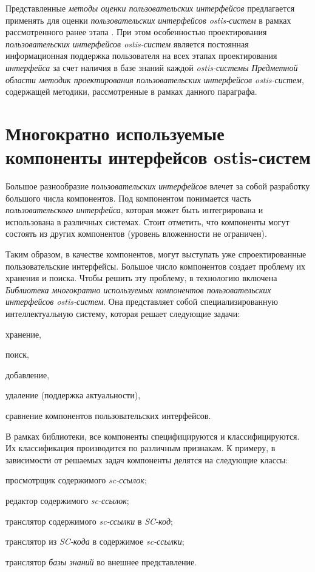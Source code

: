 Представленные \textit{методы оценки пользовательских интерфейсов} предлагается применять для оценки \textit{пользовательских интерфейсов ostis-систем} в рамках рассмотренного ранее этапа . При этом особенностью проектирования \textit{пользовательских интерфейсов ostis-систем} является постоянная информационная поддержка пользователя на всех этапах проектирования \textit{интерфейса} за счет наличия в базе знаний каждой \textit{ostis-системы} \textit{Предметной области методик проектирования пользовательских интерфейсов ostis-систем}, содержащей методики, рассмотренные в рамках данного параграфа.


\section{Многократно используемые компоненты интерфейсов ostis-систем}
\label{sec_reusable_UI_components}

Большое разнообразие \textit{пользовательских интерфейсов} влечет за собой разработку большого числа компонентов. Под компонентом понимается часть \textit{пользовательского интерфейса}, которая может быть интегрирована и использована в различных системах.
Стоит отметить, что компоненты могут состоять из других компонентов (уровень вложенности не ограничен). 

Таким образом, в качестве компонентов, могут выступать уже спроектированные
пользовательские интерфейсы. Большое число компонентов создает проблему их хранения и поиска. Чтобы решить эту проблему, в технологию включена \textit{Библиотека многократно используемых компонентов пользовательских интерфейсов ostis-систем}. Она представляет собой специализированную интеллектуальную систему, которая решает следующие задачи:
\begin{textitemize}
	\item хранение,
	\item поиск,
	\item добавление,
	\item удаление (поддержка актуальности),
	\item сравнение компонентов пользовательских интерфейсов.
\end{textitemize}

В рамках библиотеки, все компоненты специфицируются и классифицируются. Их
классификация производится по различным признакам. К примеру, в зависимости от решаемых задач компоненты делятся на следующие классы:

\begin{textitemize}
	\item просмотрщик содержимого \textit{sc-ссылок};
	\item редактор содержимого \textit{sc-ссылок};
	\item транслятор содержимого \textit{sc-ссылки} в \textit{SC-код};
	\item транслятор из \textit{SC-кода} в содержимое \textit{sc-ссылки};
	\item транслятор \textit{базы знаний} во внешнее представление.
\end{textitemize}

